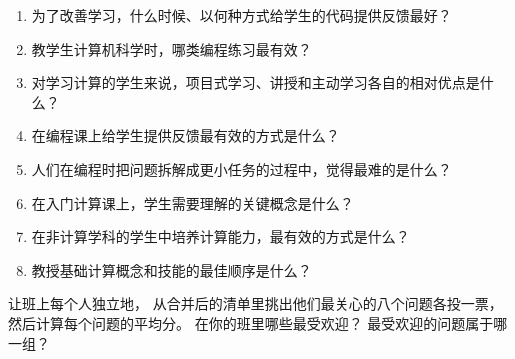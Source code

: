 \begin{enumerate}

\item
  为了改善学习，什么时候、以何种方式给学生的代码提供反馈最好？

\item
  教学生计算机科学时，哪类编程练习最有效？

\item
  对学习计算的学生来说，项目式学习、讲授和主动学习各自的相对优点是什么？

\item
  在编程课上给学生提供反馈最有效的方式是什么？

\item
  人们在编程时把问题拆解成更小任务的过程中，觉得最难的是什么？

\item
  在入门计算课上，学生需要理解的关键概念是什么？

\item
  在非计算学科的学生中培养计算能力，最有效的方式是什么？

\item
  教授基础计算概念和技能的最佳顺序是什么？

\end{enumerate}

让班上每个人独立地，
从合并后的清单里挑出他们最关心的八个问题各投一票，
然后计算每个问题的平均分。
在你的班里哪些最受欢迎？
最受欢迎的问题属于哪一组？
